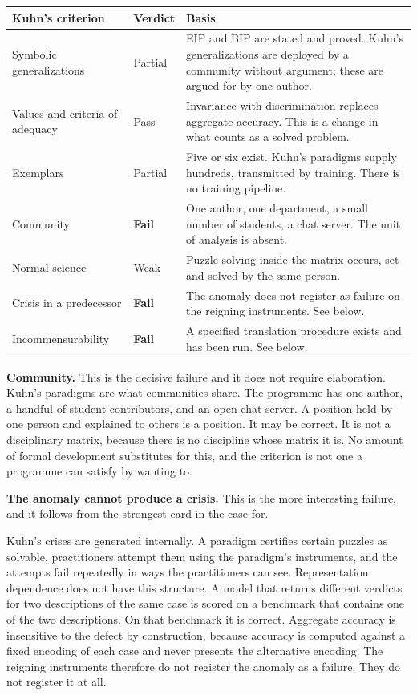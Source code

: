 \documentclass[11pt,letterpaper]{article}
\begin{document}
\begin{longtable}{p{} p{} p{}}
\toprule
\textbf{Kuhn's criterion} & \textbf{Verdict} & \textbf{Basis} \\
\midrule
\endhead
Symbolic generalizations & Partial & EIP and BIP are stated and proved. Kuhn's generalizations are deployed by a community without argument; these are argued for by one author. \\
Values and criteria of adequacy & Pass & Invariance with discrimination replaces aggregate accuracy. This is a change in what counts as a solved problem. \\
Exemplars & Partial & Five or six exist. Kuhn's paradigms supply hundreds, transmitted by training. There is no training pipeline. \\
Community & \textbf{Fail} & One author, one department, a small number of students, a chat server. The unit of analysis is absent. \\
Normal science & Weak & Puzzle-solving inside the matrix occurs, set and solved by the same person. \\
Crisis in a predecessor & \textbf{Fail} & The anomaly does not register as failure on the reigning instruments. See below. \\
Incommensurability & \textbf{Fail} & A specified translation procedure exists and has been run. See below. \\
\bottomrule
\end{longtable}

\textbf{Community.} This is the decisive failure and it does not require
elaboration. Kuhn's paradigms are what communities share. The programme has one
author, a handful of student contributors, and an open chat server. A position
held by one person and explained to others is a position. It may be correct. It
is not a disciplinary matrix, because there is no discipline whose matrix it is.
No amount of formal development substitutes for this, and the criterion is not
one a programme can satisfy by wanting to.

\textbf{The anomaly cannot produce a crisis.} This is the more interesting
failure, and it follows from the strongest card in the case for.

Kuhn's crises are generated internally. A paradigm certifies certain puzzles as
solvable, practitioners attempt them using the paradigm's instruments, and the
attempts fail repeatedly in ways the practitioners can see. Representation
dependence does not have this structure. A model that returns different verdicts
for two descriptions of the same case is scored on a benchmark that contains one
of the two descriptions. On that benchmark it is correct. Aggregate accuracy is
insensitive to the defect by construction, because accuracy is computed against
a fixed encoding of each case and never presents the alternative encoding. The
reigning instruments therefore do not register the anomaly as a failure. They do
not register it at all.
\end{document}

